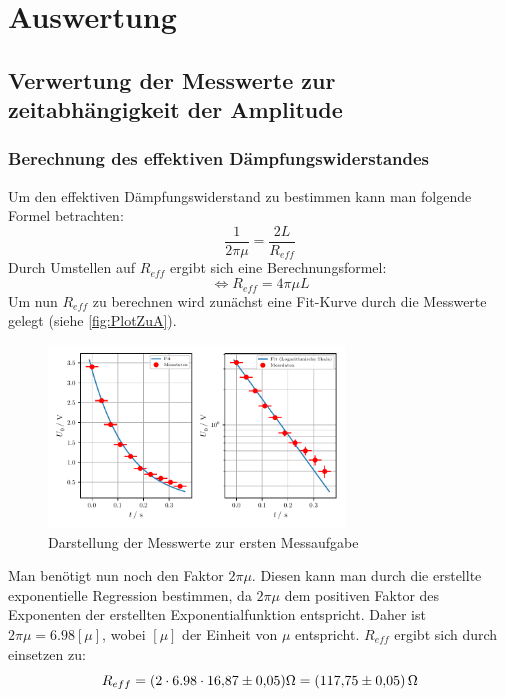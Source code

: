 \section{Auswertung}
\label{sec:Auswertung}
\subsection{Verwertung der Messwerte zur zeitabhängigkeit der Amplitude}
\label{subsec:AuswertungA}
\subsubsection{Berechnung des effektiven Dämpfungswiderstandes}
\label{subsubsec:Erste Rechnung}
Um den effektiven Dämpfungswiderstand zu bestimmen kann man folgende Formel betrachten: 
\begin{equation}
  \label{eqn:Abklingdauer}
  \frac{1}{2\pi\mu} = \frac{2L}{R_{eff}}
\end{equation}
Durch Umstellen auf $R_{eff}$ ergibt sich eine Berechnungsformel:
\begin{equation}
  \label{Abklingdauer1}
  \Longleftrightarrow R_{eff} = 4\pi\mu L
\end{equation}
Um nun $R_{eff}$ zu berechnen wird zunächst eine Fit-Kurve durch die Messwerte gelegt (siehe \autoref{fig:PlotZuA}).
\begin{figure}
  \centering
  \includegraphics[width=0.7\textwidth]{PlotZuA.pdf}
  \caption{Darstellung der Messwerte zur ersten Messaufgabe}
  \label{fig:PlotZuA}
\end{figure}
Man benötigt nun noch den Faktor $2\pi\mu$. Diesen kann man durch die erstellte exponentielle Regression 
bestimmen, da $2\pi\mu$ dem positiven Faktor des Exponenten der erstellten Exponentialfunktion entspricht. 
Daher ist $2\pi\mu = 6.98[\mu]$, wobei $[\mu]$ der Einheit von $\mu$ entspricht. 
$R_{eff}$ ergibt sich durch einsetzen zu:
\begin{equation}
  R_{eff} = (2\cdot 6.98\cdot \num{16.87\pm 0.05}) \unit{\ohm} = (\num{117.75 \pm 0.05})\,\unit{\ohm}
\end{equation}